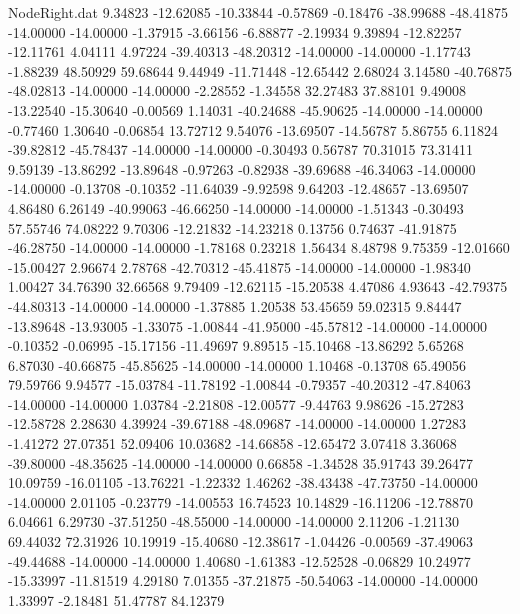 \begin{filecontents}{NodeRight.dat}
   9.34823  -12.62085  -10.33844    -0.57869   -0.18476  -38.99688  -48.41875  -14.00000  -14.00000   -1.37915   -3.66156   -6.88877   -2.19934
   9.39894  -12.82257  -12.11761     4.04111    4.97224  -39.40313  -48.20312  -14.00000  -14.00000   -1.17743   -1.88239   48.50929   59.68644
   9.44949  -11.71448  -12.65442     2.68024    3.14580  -40.76875  -48.02813  -14.00000  -14.00000   -2.28552   -1.34558   32.27483   37.88101
   9.49008  -13.22540  -15.30640    -0.00569    1.14031  -40.24688  -45.90625  -14.00000  -14.00000   -0.77460    1.30640   -0.06854   13.72712
   9.54076  -13.69507  -14.56787     5.86755    6.11824  -39.82812  -45.78437  -14.00000  -14.00000   -0.30493    0.56787   70.31015   73.31411
   9.59139  -13.86292  -13.89648    -0.97263   -0.82938  -39.69688  -46.34063  -14.00000  -14.00000   -0.13708   -0.10352  -11.64039   -9.92598
   9.64203  -12.48657  -13.69507     4.86480    6.26149  -40.99063  -46.66250  -14.00000  -14.00000   -1.51343   -0.30493   57.55746   74.08222
   9.70306  -12.21832  -14.23218     0.13756    0.74637  -41.91875  -46.28750  -14.00000  -14.00000   -1.78168    0.23218    1.56434    8.48798
   9.75359  -12.01660  -15.00427     2.96674    2.78768  -42.70312  -45.41875  -14.00000  -14.00000   -1.98340    1.00427   34.76390   32.66568
   9.79409  -12.62115  -15.20538     4.47086    4.93643  -42.79375  -44.80313  -14.00000  -14.00000   -1.37885    1.20538   53.45659   59.02315
   9.84447  -13.89648  -13.93005    -1.33075   -1.00844  -41.95000  -45.57812  -14.00000  -14.00000   -0.10352   -0.06995  -15.17156  -11.49697
   9.89515  -15.10468  -13.86292     5.65268    6.87030  -40.66875  -45.85625  -14.00000  -14.00000    1.10468   -0.13708   65.49056   79.59766
   9.94577  -15.03784  -11.78192    -1.00844   -0.79357  -40.20312  -47.84063  -14.00000  -14.00000    1.03784   -2.21808  -12.00577   -9.44763
   9.98626  -15.27283  -12.58728     2.28630    4.39924  -39.67188  -48.09687  -14.00000  -14.00000    1.27283   -1.41272   27.07351   52.09406
  10.03682  -14.66858  -12.65472     3.07418    3.36068  -39.80000  -48.35625  -14.00000  -14.00000    0.66858   -1.34528   35.91743   39.26477
  10.09759  -16.01105  -13.76221    -1.22332    1.46262  -38.43438  -47.73750  -14.00000  -14.00000    2.01105   -0.23779  -14.00553   16.74523
  10.14829  -16.11206  -12.78870     6.04661    6.29730  -37.51250  -48.55000  -14.00000  -14.00000    2.11206   -1.21130   69.44032   72.31926
  10.19919  -15.40680  -12.38617    -1.04426   -0.00569  -37.49063  -49.44688  -14.00000  -14.00000    1.40680   -1.61383  -12.52528   -0.06829
  10.24977  -15.33997  -11.81519     4.29180    7.01355  -37.21875  -50.54063  -14.00000  -14.00000    1.33997   -2.18481   51.47787   84.12379

\end{filecontents}
